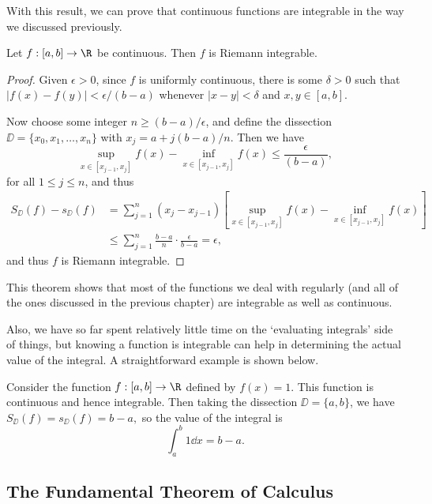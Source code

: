 \documentclass[a4paper]{scrartcl}
\begin{document}
With this result, we can prove that continuous functions are integrable in the way we discussed previously.


\begin{theorem}
	Let $f:[a, b] \rightarrow \R$ be continuous. Then $f$ is Riemann integrable.
\end{theorem}
\begin{proof}
	Given $\epsilon > 0$, since $f$ is uniformly continuous, there is some $\delta > 0$ such that $|f(x) - f(y)| < \epsilon/(b - a)$ whenever $|x - y| < \delta$ and $x, y \in [a, b]$.

	Now choose some integer $n \geq (b - a)/\epsilon$, and define the dissection $\DD = \{x_0, x_1, \dots, x_n\}$ with $x_j = a + j(b - a)/n$. Then we have
	$$
	\sup_{x \in [x_{j - 1}, x_j]} f(x) - \inf_{x \in [x_{j - 1}, x_j]} f(x) \leq \frac{\epsilon}{(b - a)},
	$$
	for all $1 \leq j \leq n$, and thus 
	\begin{align*}
		S_\DD(f) - s_\DD(f) &= \sum_{j = 1}^n (x_j - x_{j - 1})\left[\sup_{x \in [x_{j - 1}, x_j]} f(x) - \inf_{x \in [x_{j - 1}, x_j]} f(x)\right] \\
		&\leq \sum_{j = 1}^n \frac{b - a}{n} \cdot \frac{\epsilon}{b - a} = \epsilon,
	\end{align*}
	and thus $f$ is Riemann integrable.
\end{proof}

This theorem shows that most of the functions we deal with regularly (and all of the ones discussed in the previous chapter) are integrable as well as continuous.


Also, we have so far spent relatively little time on the `evaluating integrals' side of things, but knowing a function is integrable can help in determining the actual value of the integral. A straightforward example is shown below.

\begin{example}[Integral of $f(x) = 1$]
	Consider the function $f:[a, b] \rightarrow \R$ defined by $f(x) = 1$. This function is continuous and hence integrable. Then taking the dissection $\DD = \{a, b\}$, we have
	$
	S_{\DD}(f) = s_{\DD}(f) = b - a,
	$ so the value of the integral is
	$$
	\int_a^b 1 \dd x = b - a.
	$$
\end{example}


\subsection{The Fundamental Theorem of Calculus}
\end{document}
